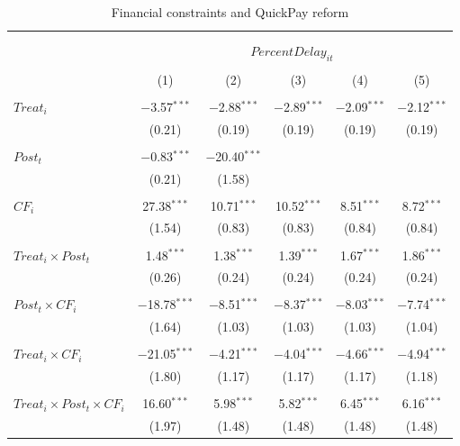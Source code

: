 \documentclass[
]{article}
\begin{document}
\begin{table}[H] \centering 
  \caption{Financial constraints and QuickPay reform} 
  \label{} 
\small 
\begin{tabular}{@{\extracolsep{-2pt}}lccccc} 
\\[-1.8ex]\hline 
\hline \\[-1.8ex] 
\\[-1.8ex] & \multicolumn{5}{c}{$PercentDelay_{it}$  } \\ 
\\[-1.8ex] & (1) & (2) & (3) & (4) & (5)\\ 
\hline \\[-1.8ex] 
 $Treat_i$ & $-$3.57$^{***}$ & $-$2.88$^{***}$ & $-$2.89$^{***}$ & $-$2.09$^{***}$ & $-$2.12$^{***}$ \\ 
  & (0.21) & (0.19) & (0.19) & (0.19) & (0.19) \\ 
  & & & & & \\ 
 $Post_t$ & $-$0.83$^{***}$ & $-$20.40$^{***}$ &  &  &  \\ 
  & (0.21) & (1.58) &  &  &  \\ 
  & & & & & \\ 
 $CF_i$ & 27.38$^{***}$ & 10.71$^{***}$ & 10.52$^{***}$ & 8.51$^{***}$ & 8.72$^{***}$ \\ 
  & (1.54) & (0.83) & (0.83) & (0.84) & (0.84) \\ 
  & & & & & \\ 
 $Treat_i \times Post_t$ & 1.48$^{***}$ & 1.38$^{***}$ & 1.39$^{***}$ & 1.67$^{***}$ & 1.86$^{***}$ \\ 
  & (0.26) & (0.24) & (0.24) & (0.24) & (0.24) \\ 
  & & & & & \\ 
 $Post_t \times CF_i$ & $-$18.78$^{***}$ & $-$8.51$^{***}$ & $-$8.37$^{***}$ & $-$8.03$^{***}$ & $-$7.74$^{***}$ \\ 
  & (1.64) & (1.03) & (1.03) & (1.03) & (1.04) \\ 
  & & & & & \\ 
 $Treat_i \times CF_i$ & $-$21.05$^{***}$ & $-$4.21$^{***}$ & $-$4.04$^{***}$ & $-$4.66$^{***}$ & $-$4.94$^{***}$ \\ 
  & (1.80) & (1.17) & (1.17) & (1.17) & (1.18) \\ 
  & & & & & \\ 
 $Treat_i \times Post_t \times CF_i$ & 16.60$^{***}$ & 5.98$^{***}$ & 5.82$^{***}$ & 6.45$^{***}$ & 6.16$^{***}$ \\ 
  & (1.97) & (1.48) & (1.48) & (1.48) & (1.48) \\ 

\end{tabular}
\end{table}
\end{document}

